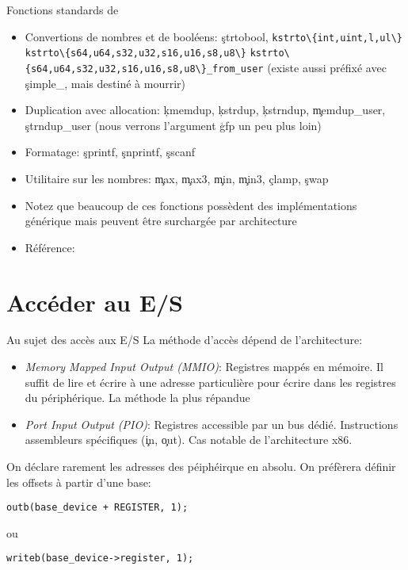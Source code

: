 \begin{frame}{Fonctions standards de }
  \begin{itemize} 
  \item  Convertions   de  nombres  et   de  booléens:  \c{strtobool},
    \lstinline+kstrto\{int,uint,l,ul\}+
    \lstinline+kstrto\{s64,u64,s32,u32,s16,u16,s8,u8\}+
    \lstinline+kstrto\{s64,u64,s32,u32,s16,u16,s8,u8\}_from_user+
    (existe aussi préfixé avec \c{simple_}, mais destiné à mourrir)
  \item   Duplication  avec   allocation:   \c{kmemdup},  \c{kstrdup},
    \c{kstrndup},  \c{memdup_user},   \c{strndup_user}  (nous  verrons
    l'argument \c{gfp} un peu plus loin)
  \item Formatage: \c{sprintf}, \c{snprintf}, \c{sscanf}
  \item  Utilitaire  sur  les  nombres:  \c{max},  \c{max3},  \c{min},
    \c{min3}, \c{clamp}, \c{swap}
  \item   Notez  que   beaucoup   de  ces   fonctions  possèdent   des
    implémentations  générique   mais  peuvent  être   surchargée  par
    architecture
  \item Référence:  
  \end{itemize}
\end{frame} 

\section{Accéder au E/S}

\begin{frame}[fragile=singleslide]{Au sujet des accès aux E/S}
  La méthode d'accès dépend de l'architecture:
  \begin{itemize} 
  \item \emph{Memory Mapped Input  Output (MMIO)}: Registres mappés en
    mémoire.  Il suffit  de lire et écrire à  une adresse particulière
    pour écrire dans les registres du périphérique. La méthode la plus
    répandue
  \item \emph{Port  Input Output  (PIO)}: Registres accessible  par un
    bus   dédié.    Instructions   assembleurs  spécifiques   (\c{in},
    \c{out}).  Cas notable de l'architecture x86.
  \end{itemize}

  On  déclare rarement  les  adresses des  péiphéirque  en absolu.  On
  préfèrera définir les offsets à partir d'une base:
  \begin{lstlisting}
outb(base_device + REGISTER, 1);
  \end{lstlisting} 
  ou 
  \begin{lstlisting}
writeb(base_device->register, 1);
  \end{lstlisting} 
\end{frame}

